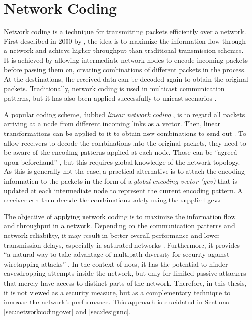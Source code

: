 \section{Network Coding}\label{sec:networkcodingfun}
Network coding is a technique for transmitting packets efficiently over a network. First described in 2000 by \citeauthor{ahlswede00networkflow}
\cite{ahlswede00networkflow}, the idea is to maximize the information flow through a network and achieve higher throughput than traditional transmission
schemes. It is achieved by allowing intermediate network nodes to encode incoming packets before passing them on, creating combinations of different
packets in the process. At the destinations, the received data can be decoded again to obtain the original packets. Traditionally, network coding is
used in multicast communication patterns, but it has also been applied successfully to unicast scenarios \cite[e.g.][]{moriam15manycorenc}.

A popular coding scheme, dubbed \textit{linear network coding} \cite{li03linearnc}, is to regard all packets arriving at a node from different incoming links as a vector.
Then, linear transformations can be applied to it to obtain new combinations to send out \cite[1]{li03linearnc}. To allow receivers to decode the
combinations into the original packets, they need to be aware of the encoding patterns applied at each node. Those can be \enquote{agreed upon
beforehand} \cite[1]{li03linearnc}, but this requires global knowledge of the network topology. As this is generally not the case, a practical
alternative is to attach the encoding information to the packets in the form of a \textit{global encoding vector (\gls{gev})}
\cites[2\psqq]{chou03practicalnc}[5\psq]{chou07ncforinternetandwireless} that is updated at each intermediate node to represent the current encoding
pattern. A receiver can then decode the combinations solely using the supplied \glspl{gev}.

The objective of applying network coding is to maximize the information flow and throughput in a network. Depending on the communication patterns and
network reliability, it may result in better overall performance and lower transmission delays, especially in saturated networks
\cite[7]{duongba11ncinmulticore}. Furthermore, it provides \enquote{a natural way to take advantage of multipath diversity for security against
wiretapping attacks} \cite[8]{fragouli07ncfundamentals}. In the context of \glspl{noc}, it has the potential to hinder eavesdropping attempts inside
the network, but only for limited passive attackers that merely have access to distinct parts of the network. Therefore, in this thesis, it is not
viewed as a security measure, but as a complementary technique to increase the network's performance. This approach is elucidated in Sections
\ref{sec:networkcodingover} and \ref{sec:designnc}.
